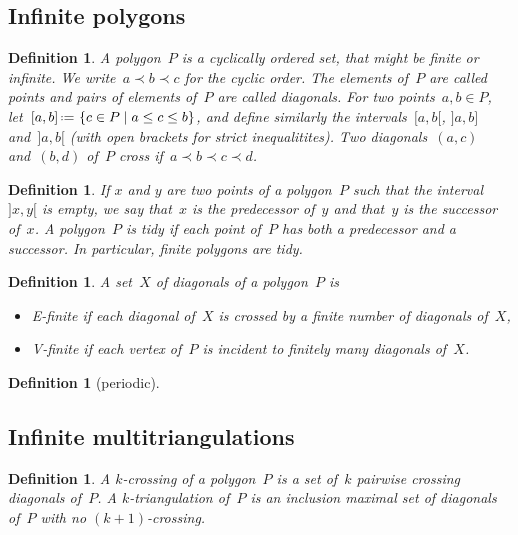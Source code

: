 \documentclass{amsart}
\newtheorem{definition}[theorem]{Definition}
\theoremstyle{remark}
\newcommand{\darkblue}{\color{darkblue}} %
\newcommand{\defn}[1]{\textsl{\darkblue #1}} %
\newcommand*{\ef}[0]{E-finite\xspace}
\newcommand*{\vf}[0]{V-finite\xspace}
\newcommand{\cl}{\prec}
\newcommand{\set}[2]{\left\{ #1 \;\middle|\; #2 \right\}} %
\newcommand{\eqdef}{\mbox{\,\raisebox{0.2ex}{\scriptsize\ensuremath{\mathrm:}}\ensuremath{=}\,}} %
\begin{document}
\subsection{Infinite polygons}

\begin{definition}
A \defn{polygon}~$P$ is a cyclically ordered set, that might be finite or infinite.
We write~$a \cl b \cl c$ for the cyclic order.
The elements of~$P$ are called \defn{points} and pairs of elements of~$P$ are called \defn{diagonals}.
For two points~$a,b \in P$, let~$[a,b] \eqdef \set{c \in P}{a \le c \le b}$, and define similarly the intervals~$[a,b[$, $]a,b]$ and~$]a,b[$ (with open brackets for strict inequalitites).
Two diagonals~$(a,c)$ and~$(b,d)$ of~$P$ \defn{cross} if~$a \cl b \cl c \cl d$.
\end{definition}

\begin{definition}
If $x$ and $y$ are two points of a polygon~$P$ such that the interval~$]x,y[$ is empty, we say that~$x$ is the \defn{predecessor} of~$y$ and that~$y$ is the \defn{successor} of~$x$. A polygon~$P$ is \defn{tidy} if each point of~$P$ has both a predecessor and a successor. In particular, finite polygons are tidy.
\end{definition}

\begin{definition}
A set~$X$ of diagonals of a polygon~$P$ is 
\begin{itemize}
\item \defn{\ef} if each diagonal of~$X$ is crossed by a finite number of diagonals of~$X$,
\item \defn{\vf} if each vertex of~$P$ is incident to finitely many diagonals of~$X$.
\end{itemize}
\end{definition}

\begin{definition}[periodic]

\end{definition}

\subsection{Infinite multitriangulations}

\begin{definition}
A \defn{$k$-crossing} of a polygon~$P$ is a set of~$k$ pairwise crossing diagonals of~$P$.
A \defn{$k$-triangulation} of~$P$ is an inclusion maximal set of diagonals of~$P$ with no $(k+1)$-crossing.
\end{definition}
\end{document}
